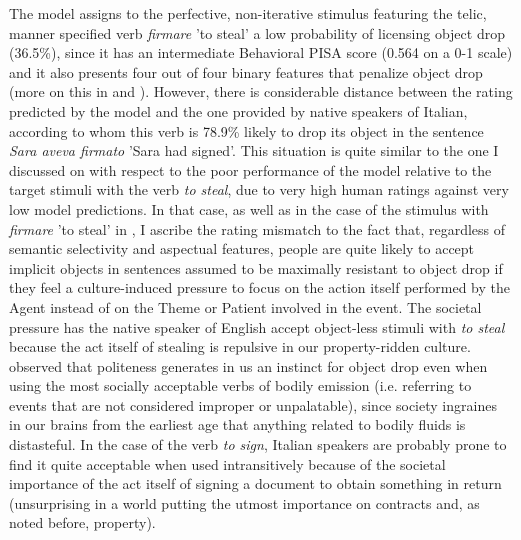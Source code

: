 The model assigns to the perfective, non-iterative stimulus featuring the telic, manner specified verb \textit{firmare} 'to steal' a low probability of licensing object drop (36.5\%), since it has an intermediate Behavioral PISA score (0.564 on a 0-1 scale) and it also presents four out of four binary features that penalize object drop (more on this in  and ). However, there is considerable distance between the rating predicted by the model and the one provided by native speakers of Italian, according to whom this verb is 78.9\% likely to drop its object in the sentence \textit{Sara aveva firmato} 'Sara had signed'. This situation is quite similar to the one I discussed on  with respect to the poor performance of the model relative to the target stimuli with the verb \textit{to steal}, due to very high human ratings against very low model predictions. In that case, as well as in the case of the stimulus with \textit{firmare} 'to steal' in , I ascribe the rating mismatch to the fact that, regardless of semantic selectivity and aspectual features, people are quite likely to accept implicit objects in sentences assumed to be maximally resistant to object drop if they feel a culture-induced pressure to focus on the action itself performed by the Agent instead of on the Theme or Patient involved in the event. The societal pressure has the native speaker of English accept object-less stimuli with \textit{to steal} because the act itself of stealing is repulsive in our property-ridden culture. \textcite[27]{Goldberg2005} observed that politeness generates in us an instinct for object drop even when using the most socially acceptable verbs of bodily emission (i.e. referring to events that are not considered improper or unpalatable), since society ingraines in our brains from the earliest age that anything related to bodily fluids is distasteful. In the case of the verb \textit{to sign}, Italian speakers are probably prone to find it quite acceptable when used intransitively because of the societal importance of the act itself of signing a document to obtain something in return (unsurprising in a world putting the utmost importance on contracts and, as noted before, property).\\
